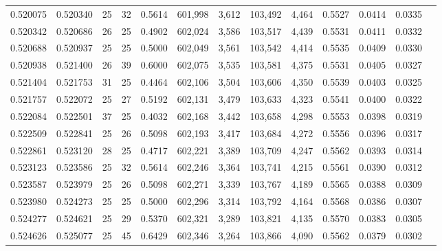 \begin{tabular}{rrrrrrrrrrrrr}
0.520075 & 0.520340 &    25 &  32 &                                     0.5614 & 601,998 &   3,612 & 103,492 &   4,464 & 0.5527 & 0.0414 & 0.0335 \\
0.520342 & 0.520686 &    26 &  25 &                                     0.4902 & 602,024 &   3,586 & 103,517 &   4,439 & 0.5531 & 0.0411 & 0.0332 \\
0.520688 & 0.520937 &    25 &  25 &                                     0.5000 & 602,049 &   3,561 & 103,542 &   4,414 & 0.5535 & 0.0409 & 0.0330 \\
0.520938 & 0.521400 &    26 &  39 &                                     0.6000 & 602,075 &   3,535 & 103,581 &   4,375 & 0.5531 & 0.0405 & 0.0327 \\
0.521404 & 0.521753 &    31 &  25 &                                     0.4464 & 602,106 &   3,504 & 103,606 &   4,350 & 0.5539 & 0.0403 & 0.0325 \\
0.521757 & 0.522072 &    25 &  27 &                                     0.5192 & 602,131 &   3,479 & 103,633 &   4,323 & 0.5541 & 0.0400 & 0.0322 \\
0.522084 & 0.522501 &    37 &  25 &                                     0.4032 & 602,168 &   3,442 & 103,658 &   4,298 & 0.5553 & 0.0398 & 0.0319 \\
0.522509 & 0.522841 &    25 &  26 &                                     0.5098 & 602,193 &   3,417 & 103,684 &   4,272 & 0.5556 & 0.0396 & 0.0317 \\
0.522861 & 0.523120 &    28 &  25 &                                     0.4717 & 602,221 &   3,389 & 103,709 &   4,247 & 0.5562 & 0.0393 & 0.0314 \\
0.523123 & 0.523586 &    25 &  32 &                                     0.5614 & 602,246 &   3,364 & 103,741 &   4,215 & 0.5561 & 0.0390 & 0.0312 \\
0.523587 & 0.523979 &    25 &  26 &                                     0.5098 & 602,271 &   3,339 & 103,767 &   4,189 & 0.5565 & 0.0388 & 0.0309 \\
0.523980 & 0.524273 &    25 &  25 &                                     0.5000 & 602,296 &   3,314 & 103,792 &   4,164 & 0.5568 & 0.0386 & 0.0307 \\
0.524277 & 0.524621 &    25 &  29 &                                     0.5370 & 602,321 &   3,289 & 103,821 &   4,135 & 0.5570 & 0.0383 & 0.0305 \\
0.524626 & 0.525077 &    25 &  45 &                                     0.6429 & 602,346 &   3,264 & 103,866 &   4,090 & 0.5562 & 0.0379 & 0.0302 \\

\end{tabular}
